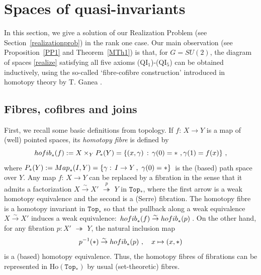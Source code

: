 \documentclass[11pt]{amsart}
\theoremstyle{definition}
\theoremstyle{remark}
\numberwithin{equation}{section}
\newcommand{\onto}{\,\,\twoheadrightarrow\,\,}
\newcommand{\la}{\label}
\newcommand{\Ho}{\mathrm{Ho}}
\newcommand{\Top}{\mathtt{Top}}
\begin{document}
\section{Spaces of quasi-invariants}
\la{S4}
In this section, we give a solution of our Realization Problem (see Section~\ref{realizationprob}) in the rank one case. Our main observation (see Proposition~\ref{PP1} and Theorem~\ref{MTh1}) is that, for  $G = SU(2)$, the diagram of spaces  \eqref{realize} satisfying all five axioms  (QI$_{1}$)-(QI$_{5}$) can be obtained inductively, using the so-called `fibre-cofibre construction' introduced in homotopy theory by T. Ganea \cite{Ga65}.  

\subsection{Fibres, cofibres and joins}
\la{S3.0}
First, we recall some basic definitions from topology. If $ f: \,X \to Y $ is a map of (well) pointed spaces, its {\it homotopy fibre} is defined by
%
$$
{\rm hofib}_*(f) :=
X \times_{Y} P_*(Y) = \{(x,\gamma)\,:\, \gamma(0) = \ast\ , \gamma(1) =f(x)\}\ ,
$$
%
where $ P_*(Y) := {\rm Map}_*(I,Y) = \{\gamma:\, I \to Y\,,\ \gamma(0) = \ast\}\, $ is the (based) path space over $Y$. 
Any map $ f: \,X \to Y $   can be replaced by a fibration in the sense that it admits a factorization
$ X \stackrel{\sim}{\to} X' \stackrel{p}{\onto} Y $ in $ \Top_* $, where the first arrow is a weak homotopy equivalence and the second is a (Serre) fibration. The homotopy fibre is a homotopy invariant in $ \Top_* $ so that the pullback along a weak equivalence  $ X \stackrel{\sim}{\to} X' $ induces a weak equivalence: $\,{\rm hofib}_*(f) \stackrel{\sim}{\to} {\rm hofib}_*(p) \,$.
On the other hand, for any fibration $ p: X' \onto Y $, the natural inclusion map
%
$$
p^{-1}(\ast) \stackrel{\sim}{\to} {\rm hofib}_*(p)\ ,\quad x \mapsto (x, \ast)
$$
%
is a (based) homotopy equivalence. Thus, the homotopy fibres of fibrations can be represented in $ \Ho(\Top_*) $ by usual (set-theoretic) fibres.
\end{document}
